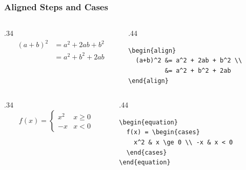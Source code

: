 \documentclass{ltx-talk}
\begin{document}
\begin{frame*}
  \frametitle{Aligned Steps and Cases}
  \begin{columns}
    \begin{column}{.34\textwidth}
      \begin{align}
        (a+b)^2 &= a^2 + 2ab + b^2 \\
                &= a^2 + b^2 + 2ab
      \end{align}
    \end{column}
    \begin{column}{.44\textwidth}
\small
\begin{verbatim}
\begin{align}
  (a+b)^2 &= a^2 + 2ab + b^2 \\
          &= a^2 + b^2 + 2ab
\end{align}
\end{verbatim}
    \end{column}
  \end{columns}

  \begin{columns}
    \begin{column}{.34\textwidth}
      \begin{equation}
        f(x) = \begin{cases} x^2 & x \ge 0 \\ -x & x < 0 \end{cases}
      \end{equation}
    \end{column}
    \begin{column}{.44\textwidth}
\small
\begin{verbatim}
\begin{equation}
  f(x) = \begin{cases}
    x^2 & x \ge 0 \\ -x & x < 0
  \end{cases}
\end{equation}
\end{verbatim}
    \end{column}
  \end{columns}
\end{frame*}
\end{document}
